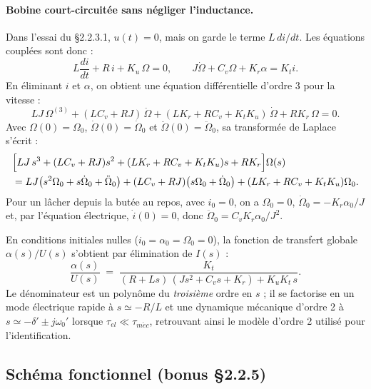 \paragraph{Bobine court-circuitée sans négliger l'inductance.}
Dans l'essai du §2.2.3.1, \(u(t)=0\), mais on garde le terme \(L\,di/dt\). Les équations couplées sont donc :
\[
L\frac{di}{dt}+R\,i+K_u\,\Omega=0,
\qquad
J\dot\Omega+C_v\Omega+K_r\alpha=K_t i.
\]
En éliminant \(i\) et \(\alpha\), on obtient une équation différentielle d'ordre 3 pour la vitesse :
\begin{equation}
LJ\,\Omega^{(3)}
+(LC_v+RJ)\,\ddot\Omega
+(LK_r+RC_v+K_tK_u)\,\dot\Omega
+RK_r\,\Omega = 0.
\label{eq:short_full_ode}
\end{equation}
Avec \(\Omega(0)=\Omega_0\), \(\dot\Omega(0)=\dot\Omega_0\) et \(\ddot\Omega(0)=\ddot\Omega_0\), sa transformée de Laplace s'écrit :
\begin{equation}
\begin{aligned}
&\Bigl[LJ\,s^3+(LC_v+RJ)s^2+(LK_r+RC_v+K_tK_u)s+RK_r\Bigr]\Omega(s) \\
&= LJ\bigl(s^2\Omega_0+s\dot\Omega_0+\ddot\Omega_0\bigr)
+(LC_v+RJ)\bigl(s\Omega_0+\dot\Omega_0\bigr)
+(LK_r+RC_v+K_tK_u)\Omega_0.
\end{aligned}
\label{eq:laplace_short_full}
\end{equation}
Pour un lâcher depuis la butée au repos, avec \(i_0=0\), on a \(\Omega_0=0\), \(\dot\Omega_0=-K_r\alpha_0/J\) et, par l'équation électrique, \(\dot i(0)=0\), donc \(\ddot\Omega_0=C_vK_r\alpha_0/J^2\).

En conditions initiales nulles (\(i_0 = \alpha_0 = \Omega_0 = 0\)), la fonction de transfert globale \(\alpha(s)/U(s)\) s'obtient par élimination de \(I(s)\) :
\begin{equation}
\frac{\alpha(s)}{U(s)} \;=\; \frac{K_t}{(R + L s)\,(J s^2 + C_v s + K_r) + K_u K_t\,s}.
\label{eq:FT}
\end{equation}
Le dénominateur est un polynôme du \emph{troisième} ordre en \(s\) ; il se factorise en un mode électrique rapide à \(s \simeq -R/L\) et une dynamique mécanique d'ordre 2 à \(s \simeq -\delta' \pm j\omega_0'\) lorsque \(\tau_{el} \ll \tau_{m\acute{e}c}\), retrouvant ainsi le modèle d'ordre 2 utilisé pour l'identification.

\subsection{Schéma fonctionnel (bonus §2.2.5)}

